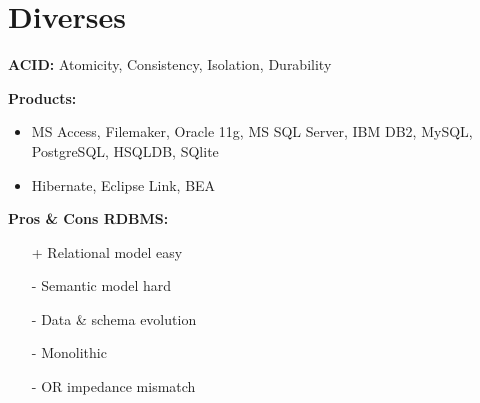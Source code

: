 
\section{Diverses}

\begin{breakbox}
\textbf{ACID:}
\newline Atomicity, Consistency, Isolation, Durability
\end{breakbox}

\begin{breakbox}
\textbf{Products:}
\begin{itemize}
	\item MS Access, Filemaker, Oracle 11g, MS SQL Server, IBM DB2, MySQL, PostgreSQL, HSQLDB, SQlite
	\item Hibernate, Eclipse Link, BEA
\end{itemize}
\end{breakbox}

\begin{breakbox}
\textbf{Pros \& Cons RDBMS:}
\begin{itemize}
	\item[+] Relational model easy
	\item[-] Semantic model hard
	\item[-] Data \& schema evolution
	\item[-] Monolithic
	\item[-] OR impedance mismatch
\end{itemize}
\end{breakbox}

